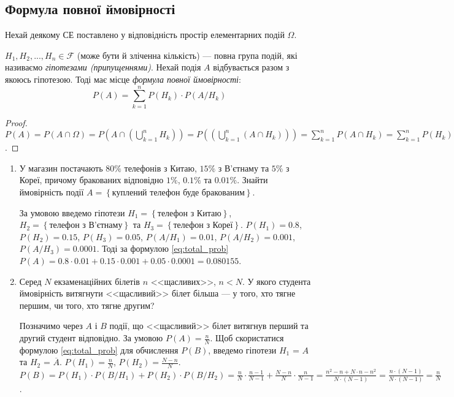 \subsection{Формула повної ймовірності}
Нехай деякому СЕ поставлено у відповідність простір елементарних подій $\Omega$.

$H_1, H_2, ..., H_n \in \mathcal{F}$ (може бути й зліченна кількість) --- повна група подій,
які називаємо \emph{гіпотезами (припущеннями)}.
Нехай подія $A$ відбувається разом з якоюсь гіпотезою. Тоді має місце
\emph{формула повної ймовірності}:
\begin{equation}\label{eq:total_prob}
    P\left( A \right) = \sum_{k=1}^n P(H_k)\cdot P(A/H_k)
\end{equation}
\begin{proof}
    $P(A) = P(A \cap \Omega) = P(A \cap (\bigcup_{k=1}^n H_k)) = P((\bigcup_{k=1}^n (A\cap H_k))) = \sum_{k=1}^n P(A\cap H_k) = \sum_{k=1}^n P(H_k)\cdot P(A/H_k)$.
\end{proof}

\begin{example}
    \begin{enumerate}
        \item У магазин постачають $80\%$ телефонів з Китаю, $15\%$ з В'єтнаму та $5\%$ з Кореї,
        причому бракованих відповідно $1\%$, $0.1\%$ та $0.01\%$.
        Знайти ймовірність події $A = \left\{ \text{куплений телефон буде бракованим}\right\}$.

        За умовою введемо гіпотези $H_1 = \left\{ \text{телефон з Китаю}\right\}$,
        $H_2 = \left\{ \text{телефон з В'єтнаму}\right\}$ та $H_3 = \left\{ \text{телефон з Кореї}\right\}$.
        $P(H_1) = 0.8$, $P(H_2) = 0.15$, $P(H_3) = 0.05$,
        $P(A/H_1) = 0.01$, $P(A/H_2) = 0.001$, $P(A/H_3) = 0.0001$.
        Тоді за формулою \eqref{eq:total_prob} $P(A) = 0.8\cdot 0.01 + 0.15\cdot 0.001 + 0.05\cdot 0.0001 = 0.080155$.
        \item Серед $N$ екзаменаційних білетів $n$ <<щасливих>>, $n<N$.
        У якого студента ймовірність витягнути <<щасливий>> білет більша --- у того, хто тягне першим, чи того, хто тягне другим?

        Позначимо через $A$ і $B$ події, що <<щасливий>> білет витягнув перший та другий студент відповідно. За умовою $P(A) = \frac{n}{N}$.
        Щоб скористатися формулою \eqref{eq:total_prob} для обчислення $P(B)$, введемо гіпотези $H_1$ = $A$ та $H_2$ = $\overline{A}$.
        $P(H_1) = \frac{n}{N}$, $P(H_2) = \frac{N-n}{N}$.
        \\ $P(B) = P(H_1)\cdot P(B/H_1) + P(H_2)\cdot P(B/H_2) = \frac{n}{N}\cdot \frac{n-1}{N-1} + \frac{N-n}{N}\cdot \frac{n}{N-1} = 
        \frac{n^2 - n + N\cdot n - n^2}{N\cdot(N-1)} = \frac{n\cdot (N-1)}{N\cdot(N-1)} = \frac{n}{N}$.
    \end{enumerate}
\end{example}

